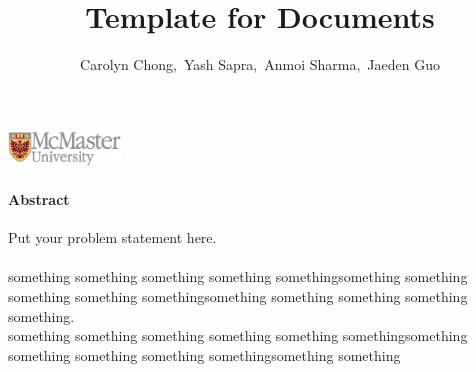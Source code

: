 \documentclass[12,titlepic]{article}
\begin{document}
	
	\begin{titlepage}
	
		\title{\vspace{3.5cm}Template for Documents\vspace{9cm} } 
		
		\author{Carolyn Chong,\ Yash Sapra,\ Anmoi Sharma,\ Jaeden Guo}
		
		\maketitle
		\centering\includegraphics[width=3cm]{mcmaster}
		\thispagestyle{empty}
		
		
		
	\end{titlepage}


\paragraph*{Abstract} %
Put your problem statement here.\\ \\
\indent something something something something somethingsomething something something something somethingsomething something something something something.\\ 
\indent something something something something something somethingsomething something something something somethingsomething something
\end{document}
